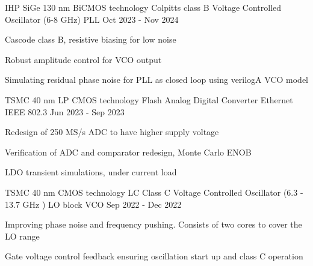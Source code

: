 


\begin{cventries}


\cventry
{IHP SiGe 130 nm BiCMOS technology} %
{Colpitts class B Voltage Controlled Oscillator (6-8 GHz) } %
{PLL} %
{Oct 2023 - Nov 2024} %
{ %
\begin{cvitems}
    \item {Cascode class B, resistive biasing for low noise}
    \item {Robust amplitude control for VCO output}
    \item {Simulating residual phase noise for PLL as closed loop using verilogA VCO model}
\end{cvitems}
}


\cventry
{TSMC 40 nm LP CMOS technology} %
{Flash Analog Digital Converter} %
{Ethernet IEEE 802.3} %
{Jun 2023 - Sep 2023} %
{ %
\begin{cvitems}
    \item {Redesign of 250 MS/s ADC to have higher supply voltage}
    \item {Verification of ADC and comparator redesign, Monte Carlo ENOB}
    \item {LDO transient simulations, under current load}
\end{cvitems}
}


\cventry
{TSMC 40 nm CMOS technology} %
{LC Class C Voltage Controlled Oscillator (6.3 - 13.7 GHz )} %
{LO block VCO} %
{Sep 2022 - Dec 2022} %
{ %
\begin{cvitems}
    \item {Improving phase noise and frequency pushing. Consists of two cores to cover the LO range}
    \item {Gate voltage control feedback ensuring oscillation start up and class C operation}
\end{cvitems}
}


\end{cventries}
